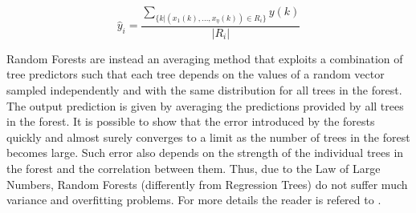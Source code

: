 \begin{equation}\label{eqAverageResponseRT}
\hat y_{i} = \frac{\sum\limits_{\{k|(x_1(k),\ldots, x_\eta(k)) \in R_i\}}y(k)}{|R_i|}
\end{equation}


\noindent Random Forests \cite{BreimanML2001} are instead an averaging method that exploits a combination of tree predictors such that each tree depends on the values of a random vector sampled independently and with the same distribution for all trees in the forest. The output prediction is given by averaging the predictions provided by all trees in the forest. It is possible to show that the error introduced by the forests quickly and almost surely converges to a limit as the number of trees in the forest becomes large. Such error also depends on the strength of the individual trees in the forest and the correlation between them. Thus, due to the Law of Large Numbers, Random Forests (differently from Regression Trees) do not suffer much variance and overfitting problems. For more details the reader is refered to \cite{BreimanCART2017,BreimanML2001}.


